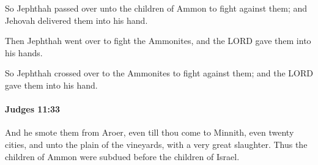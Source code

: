 			\begin{versebox}
					\item[BHS] 
					\item[ASV] So Jephthah passed over unto the children of Ammon to fight against them; and Jehovah delivered them into his hand.
					\item[NIV] Then Jephthah went over to fight the Ammonites, and the LORD gave them into his hands.
					\item[NRSV] So Jephthah crossed over to the Ammonites to fight against them; and the LORD gave them into his hand.
			\end{versebox}

		\paragraph{Judges 11:33} %
			\label{JUDGES-11-33}

			And he smote them from Aroer, even till thou come to Minnith, even twenty cities, and unto the plain of the vineyards, with a very great slaughter. Thus the children of Ammon were subdued before the children of Israel.

